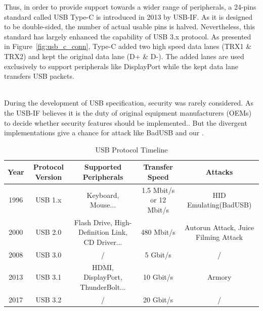 Thus, in order to provide support towards a wider range of peripherals, a 24-pins standard called USB Type-C is introduced in 2013 by USB-IF. As it is designed to be double-sided, the number of actual usable pins is halved. Nevertheless, this standard has largely enhanced the capability of USB 3.x protocol. As presented in Figure~\ref{fig:usb_c_conn}, Type-C added two high speed data lanes (TRX1 \& TRX2) and kept the original data lane (D+ \& D-). The added lanes are used exclusively to support peripherals like DisplayPort while the kept data lane transfers USB packets.

\noindent{}\\
During the development of USB specification, security was rarely considered.  As the USB-IF believes it is the duty of original equipment manufacturers (OEMs) to decide whether security features should be implemented.. But the divergent implementations give a chance for attack like BadUSB\cite{rubber} and our \tool.


\begin{table}
\begin{tabular}{|c|c|c|c|c|}
	\hline
	Year & Protocol Version & Supported Peripherals & Transfer Speed & Attacks \\
	\hline
	1996 & USB 1.x & Keyboard, Mouse... & 1.5 Mbit/s or 12 Mbit/s & HID Emulating(BadUSB) \\
	\hline
	2000 & USB 2.0 & Flash Drive, High-Definition Link, CD Driver... & 480 Mbit/s & Autorun Attack, Juice Filming Attack \\
	\hline
	2008 & USB 3.0 & / & 5 Gbit/s & / \\
	\hline
	2013 & USB 3.1 & HDMI, DisplayPort, ThunderBolt... & 10 Gbit/s & Armory \\
	\hline
	2017 & USB 3.2 & / & 20 Gbit/s & / \\
	\hline
\end{tabular}
	\linebreak
\caption{USB Protocol Timeline}
\label{table:usb_timeline}
\end{table}